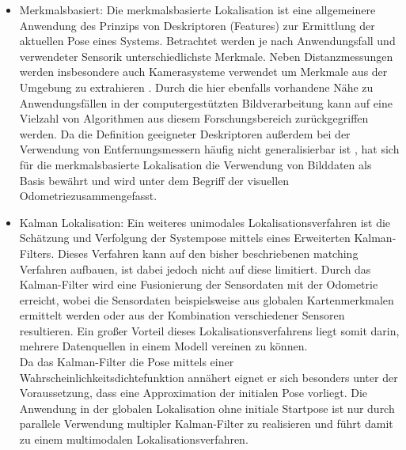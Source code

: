 \begin{itemize}
\item Merkmalsbasiert: Die merkmalsbasierte Lokalisation ist eine allgemeinere Anwendung des Prinzips von Deskriptoren (Features) zur Ermittlung der aktuellen Pose eines Systems. Betrachtet werden je nach Anwendungsfall und verwendeter Sensorik unterschiedlichste Merkmale. Neben Distanzmessungen \cite{Tomono2004} werden insbesondere auch Kamerasysteme verwendet um Merkmale aus der Umgebung zu extrahieren \cite{Se2001}. Durch die hier ebenfalls vorhandene Nähe zu Anwendungsfällen in der computergestützten Bildverarbeitung kann auf eine Vielzahl von Algorithmen aus diesem Forschungsbereich zurückgegriffen werden. Da die Definition geeigneter Deskriptoren außerdem bei der Verwendung von Entfernungsmessern häufig nicht generalisierbar ist \red[belegen!?], hat sich für die merkmalsbasierte Lokalisation die Verwendung von Bilddaten als Basis bewährt und wird unter dem Begriff der visuellen Odometrie zusammengefasst.

\item Kalman Lokalisation: Ein weiteres unimodales Lokalisationsverfahren ist die Schätzung und Verfolgung der Systempose mittels eines Erweiterten Kalman-Filters. Dieses Verfahren kann auf den bisher beschriebenen matching Verfahren aufbauen, ist dabei jedoch nicht auf diese limitiert. Durch das Kalman-Filter wird eine Fusionierung der Sensordaten mit der Odometrie erreicht, wobei die Sensordaten beispielsweise aus globalen Kartenmerkmalen ermittelt werden \cite{Leonard1991} oder aus der Kombination verschiedener Sensoren \cite{Roumeliotis1997} resultieren. Ein großer Vorteil dieses Lokalisationsverfahrens liegt somit darin, mehrere Datenquellen in einem Modell vereinen zu können.\\ Da das Kalman-Filter die Pose mittels einer Wahrscheinlichkeitsdichtefunktion annähert eignet er sich besonders unter der Voraussetzung, dass eine Approximation der initialen Pose vorliegt. Die Anwendung in der globalen Lokalisation ohne initiale Startpose ist nur durch parallele Verwendung multipler Kalman-Filter zu realisieren und führt damit zu einem multimodalen Lokalisationsverfahren.
\end{itemize}

